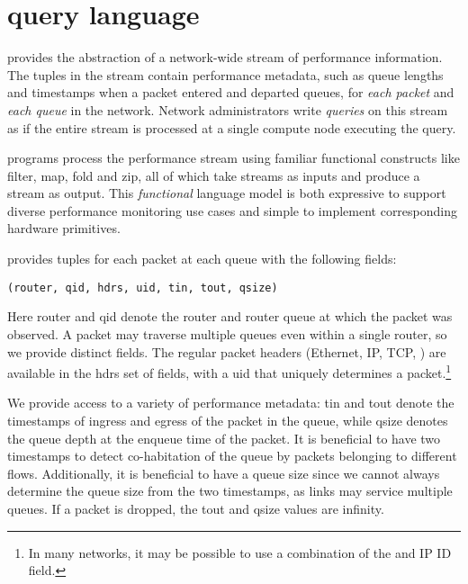 \section{\THESYSTEM query language}
\label{sec:language}
\TheSystem provides the abstraction of a network-wide stream of performance
information. The tuples in the stream contain performance metadata, such as
queue lengths and timestamps when a packet entered and departed queues, for {\em
  each packet} and {\em each queue} in the network. Network administrators write
{\em queries} on this stream as if the entire stream is processed at a single
compute node executing the query.

\TheSystem programs process the performance stream using familiar functional
constructs like {\ct filter}, {\ct map}, {\ct fold} and {\ct zip}, all of which
take streams as inputs and produce a stream as output. This {\em functional}
language model is both expressive to support diverse performance monitoring use
cases and simple to implement corresponding hardware primitives.

 \TheSystem provides tuples for each packet at
each queue with the following fields:
\begin{lstlisting}
(router, qid, hdrs, uid, tin, tout, qsize)
\end{lstlisting}
Here {\ct router} and {\ct qid} denote the router and router queue at which the
packet was observed. A packet may traverse multiple queues even within a single
router, so we provide distinct fields. The regular packet headers (Ethernet, IP,
TCP, \etc) are available in the {\ct hdrs} set of fields, with a {\ct uid} that
uniquely determines a packet.\footnote{In many networks, it may be possible to
  use a combination of the \txtftuple and IP ID field.}

We provide access to a variety of performance metadata: {\ct tin} and {\ct tout}
denote the timestamps of ingress and egress of the packet in the queue, while
{\ct qsize} denotes the queue depth at the enqueue time of the packet. It is
beneficial to have two timestamps to detect co-habitation of the queue by
packets belonging to different flows. Additionally, it is beneficial to have a
queue size since we cannot always determine the queue size from the two
timestamps, as links may service multiple queues. If a packet
is dropped, the {\ct tout} and {\ct qsize} values are {\ct infinity.}

